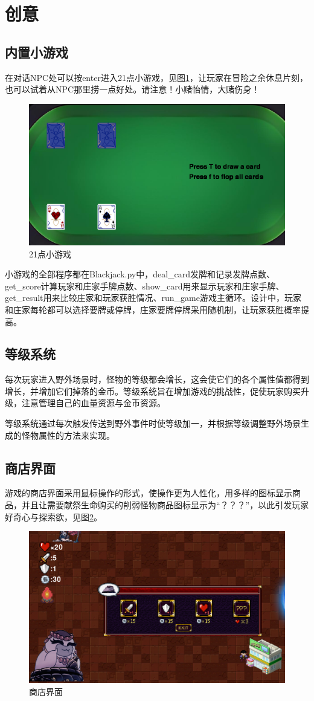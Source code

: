 \documentclass{ctexart}
\begin{document}
\section{创意}
\subsection{内置小游戏}
在对话NPC处可以按enter进入21点小游戏，见图\ref{fig:21}，让玩家在冒险之余休息片刻，也可以试着从NPC那里捞一点好处。请注意！小赌怡情，大赌伤身！
\begin{figure}[h]
\centering
\includegraphics[width=0.75\linewidth]{21.png}
\caption{\label{fig:21}21点小游戏}
\end{figure}

小游戏的全部程序都在Blackjack.py中，deal\_card发牌和记录发牌点数、get\_score计算玩家和庄家手牌点数、show\_card用来显示玩家和庄家手牌、get\_result用来比较庄家和玩家获胜情况、run\_game游戏主循环。设计中，玩家和庄家每轮都可以选择要牌或停牌，庄家要牌停牌采用随机制，让玩家获胜概率提高。

\subsection{等级系统}
每次玩家进入野外场景时，怪物的等级都会增长，这会使它们的各个属性值都得到增长，并增加它们掉落的金币。等级系统旨在增加游戏的挑战性，促使玩家购买升级，注意管理自己的血量资源与金币资源。

等级系统通过每次触发传送到野外事件时使等级加一，并根据等级调整野外场景生成的怪物属性的方法来实现。

\subsection{商店界面}
游戏的商店界面采用鼠标操作的形式，使操作更为人性化，用多样的图标显示商品，并且让需要献祭生命购买的削弱怪物商品图标显示为“？？？”，以此引发玩家好奇心与探索欲，见图\ref{fig:商店}。
\begin{figure}[h]
\centering
\includegraphics[width=0.75\linewidth]{商店.png}
\caption{\label{fig:商店}商店界面}
\end{figure}
\end{document}
